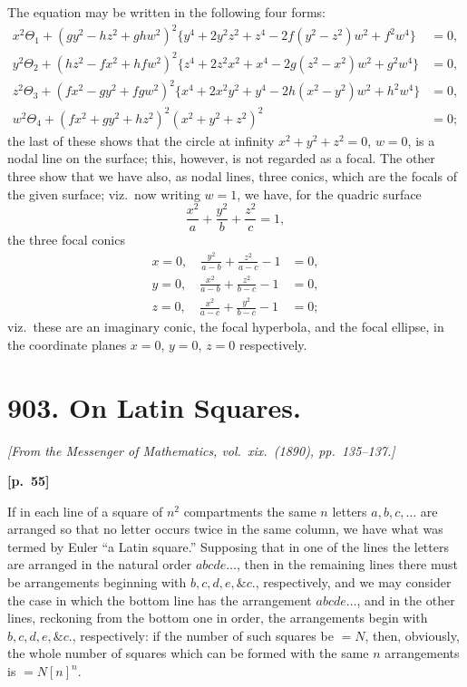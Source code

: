\documentclass[11pt,a4paper]{article}
\theoremstyle{plain}
\begin{document}
The equation may be written in the following four forms:
\begin{align*}
x^2\Theta_1 + (gy^2 - hz^2 + ghw^2)^2\{y^4 + 2y^2 z^2 + z^4 - 2f(y^2 - z^2)w^2 + f^2 w^4\} &= 0, \\
y^2\Theta_2 + (hz^2 - fx^2 + hfw^2)^2\{z^4 + 2z^2 x^2 + x^4 - 2g(z^2 - x^2)w^2 + g^2 w^4\} &= 0, \\
z^2\Theta_3 + (fx^2 - gy^2 + fgw^2)^2\{x^4 + 2x^2 y^2 + y^4 - 2h(x^2 - y^2)w^2 + h^2 w^4\} &= 0, \\
w^2\Theta_4 + (fx^2 + gy^2 + hz^2)^2(x^2 + y^2 + z^2)^2 &= 0;
\end{align*}
the last of these shows that the circle at infinity $x^2 + y^2 + z^2 = 0$, $w = 0$, is a nodal line on the surface; this, however, is not regarded as a focal. The other three show that we have also, as nodal lines, three conics, which are the focals of the given surface; viz.\ now writing $w = 1$, we have, for the quadric surface
$$
\frac{x^2}{a} + \frac{y^2}{b} + \frac{z^2}{c} = 1,
$$
the three focal conics
\begin{align*}
x = 0, \quad \frac{y^2}{a - b} + \frac{z^2}{a - c} - 1 &= 0, \\
y = 0, \quad \frac{x^2}{a - b} + \frac{z^2}{b - c} - 1 &= 0, \\
z = 0, \quad \frac{x^2}{a - c} + \frac{y^2}{b - c} - 1 &= 0;
\end{align*}
viz.\ these are an imaginary conic, the focal hyperbola, and the focal ellipse, in the coordinate planes $x = 0$, $y = 0$, $z = 0$ respectively.

\newpage

\section*{903. On Latin Squares.}

\noindent\textit{[From the Messenger of Mathematics, vol.\ xix.\ (1890), pp.\ 135--137.]}

\vspace{0.5em}
\noindent\textbf{[p.\ 55]}

If in each line of a square of $n^2$ compartments the same $n$ letters $a, b, c, \ldots$ are arranged so that no letter occurs twice in the same column, we have what was termed by Euler ``a Latin square.'' Supposing that in one of the lines the letters are arranged in the natural order $abcde\ldots$, then in the remaining lines there must be arrangements beginning with $b, c, d, e, \&c.$, respectively, and we may consider the case in which the bottom line has the arrangement $abcde\ldots$, and in the other lines, reckoning from the bottom one in order, the arrangements begin with $b, c, d, e, \&c.$, respectively: if the number of such squares be $= N$, then, obviously, the whole number of squares which can be formed with the same $n$ arrangements is $= N[n]^n$.
\end{document}
